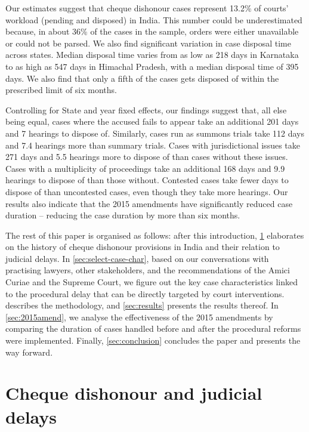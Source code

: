 \documentclass[12pt,a4paper]{article}
\begin{document}
Our estimates suggest that cheque dishonour cases represent 13.2\% of courts' workload (pending and disposed) in India. This number could be underestimated because, in about 36\% of the cases in the sample, orders were either unavailable or could not be parsed. We also find significant variation in case disposal time across states. Median disposal time varies from as low as 218 days in Karnataka to as high as 547 days in Himachal Pradesh, with a median disposal time of 395 days. We also find that only a fifth of the cases gets disposed of within the prescribed limit of six months.

Controlling for State and year fixed effects, our findings suggest that, all else being equal, cases where the accused fails to appear take an additional 201 days and 7 hearings to dispose of. Similarly, cases run as summons trials take 112 days and 7.4 hearings more than summary trials. Cases with jurisdictional issues take 271 days and 5.5 hearings more to dispose of than cases without these issues. Cases with a multiplicity of proceedings take an additional 168 days and 9.9 hearings to dispose of than those without. Contested cases take fewer days to dispose of than uncontested cases, even though they take more hearings. Our results also indicate that the 2015 amendments have significantly reduced case duration -- reducing the case duration by more than six months.

The rest of this paper is organised as follows: after this introduction, \cref{sec:history} elaborates on the history of cheque dishonour provisions in India and their relation to judicial delays. In \cref{sec:select-case-char}, based on our conversations with practising lawyers, other stakeholders, and the recommendations of the Amici Curiae and the Supreme Court, we figure out the key case characteristics linked to the procedural delay that can be directly targeted by court interventions.  describes the methodology, and \cref{sec:results} presents the results thereof. In \cref{sec:2015amend}, we analyse the effectiveness of the 2015 amendments by comparing the duration of cases handled before and after the procedural reforms were implemented. Finally, \cref{sec:conclusion} concludes the paper and presents the way forward.

\section{Cheque dishonour and judicial delays} \label{sec:history}
\end{document}
